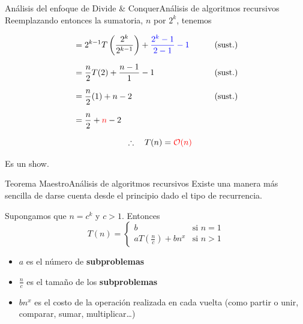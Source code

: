 \documentclass[spanish, c]{beamer}
\newcommand{\bigO}{\mathcal{O}}
\begin{document}
\begin{frame}{Análisis del enfoque de Divide \& Conquer}{Análisis de algoritmos recursivos}
    Reemplazando entonces la sumatoria, $n$ por $2^k$, tenemos

    \begin{align*}
    & = 2^{k-1} T\left(\frac{2^k}{2^{k-1}}\right) + {\color{blue} \frac{2^k - 1}{2 - 1} - 1} & \tag{\text{sust.}} \\[1.5ex]
    & = \frac{n}{2}T(2) + \frac{n - 1}{1} - 1 & \tag{\text{sust.}} \\[1.5ex]
    & = \frac{n}{2}(1) + n - 2 & \tag{sust.} \\[1.5ex]
    & = \frac{n}{2} + {\color{red} n} - 2
    \end{align*}

    $$\quad \therefore \quad T(n) = {\color{red}\bigO(n)}$$

\end{frame}

\begin{frame}[plain]
    \begin{center}
        \Huge
        Es un show.
    \end{center}
\end{frame}

\begin{frame}{Teorema Maestro}{Análisis de algoritmos recursivos}
    Existe una manera más sencilla de darse cuenta desde el principio dado el tipo de recurrencia.
    
    \bigskip

    Supongamos que $n = c^k$ y $c > 1$. Entonces
    $$T(n) = \begin{cases}
        b & \text{si } n = 1 \\
        aT\left( \frac{n}{c} \right) + bn^x & \text{si } n > 1
    \end{cases}$$

    \begin{itemize}
        \item $a$ es el \alert{número} de \textbf{subproblemas}
        \item $\frac{n}{c}$ es el \alert{tamaño} de los \textbf{subproblemas}
        \item $bn^x$ es el costo de la \alert{operación} realizada en \alert{cada vuelta} (como partir o unir, comparar, sumar, multiplicar\dots)
    \end{itemize}
\end{frame}
\end{document}
